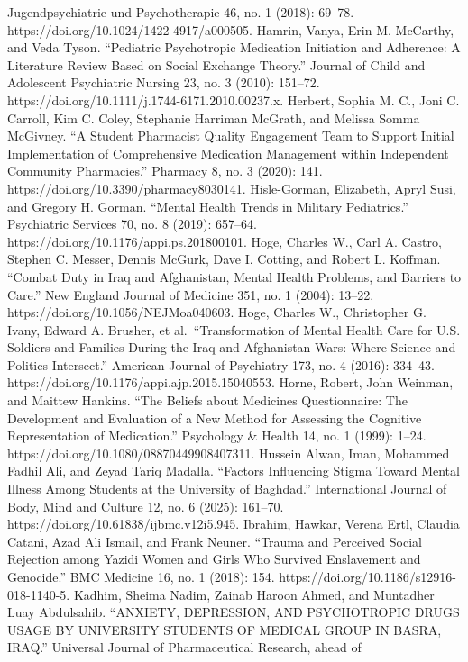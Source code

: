 Jugendpsychiatrie und Psychotherapie 46, no. 1 (2018): 69--78.
https://doi.org/10.1024/1422-4917/a000505. Hamrin, Vanya, Erin M.
McCarthy, and Veda Tyson. ``Pediatric Psychotropic Medication Initiation
and Adherence: A Literature Review Based on Social Exchange Theory.''
Journal of Child and Adolescent Psychiatric Nursing 23, no. 3 (2010):
151--72. https://doi.org/10.1111/j.1744-6171.2010.00237.x. Herbert,
Sophia M. C., Joni C. Carroll, Kim C. Coley, Stephanie Harriman McGrath,
and Melissa Somma McGivney. ``A Student Pharmacist Quality Engagement
Team to Support Initial Implementation of Comprehensive Medication
Management within Independent Community Pharmacies.'' Pharmacy 8, no. 3
(2020): 141. https://doi.org/10.3390/pharmacy8030141. Hisle-Gorman,
Elizabeth, Apryl Susi, and Gregory H. Gorman. ``Mental Health Trends in
Military Pediatrics.'' Psychiatric Services 70, no. 8 (2019): 657--64.
https://doi.org/10.1176/appi.ps.201800101. Hoge, Charles W., Carl A.
Castro, Stephen C. Messer, Dennis McGurk, Dave I. Cotting, and Robert L.
Koffman. ``Combat Duty in Iraq and Afghanistan, Mental Health Problems,
and Barriers to Care.'' New England Journal of Medicine 351, no. 1
(2004): 13--22. https://doi.org/10.1056/NEJMoa040603. Hoge, Charles W.,
Christopher G. Ivany, Edward A. Brusher, et al.~``Transformation of
Mental Health Care for U.S. Soldiers and Families During the Iraq and
Afghanistan Wars: Where Science and Politics Intersect.'' American
Journal of Psychiatry 173, no. 4 (2016): 334--43.
https://doi.org/10.1176/appi.ajp.2015.15040553. Horne, Robert, John
Weinman, and Maittew Hankins. ``The Beliefs about Medicines
Questionnaire: The Development and Evaluation of a New Method for
Assessing the Cognitive Representation of Medication.'' Psychology \&
Health 14, no. 1 (1999): 1--24.
https://doi.org/10.1080/08870449908407311. Hussein Alwan, Iman, Mohammed
Fadhil Ali, and Zeyad Tariq Madalla. ``Factors Influencing Stigma Toward
Mental Illness Among Students at the University of Baghdad.''
International Journal of Body, Mind and Culture 12, no. 6 (2025):
161--70. https://doi.org/10.61838/ijbmc.v12i5.945. Ibrahim, Hawkar,
Verena Ertl, Claudia Catani, Azad Ali Ismail, and Frank Neuner. ``Trauma
and Perceived Social Rejection among Yazidi Women and Girls Who Survived
Enslavement and Genocide.'' BMC Medicine 16, no. 1 (2018): 154.
https://doi.org/10.1186/s12916-018-1140-5. Kadhim, Sheima Nadim, Zainab
Haroon Ahmed, and Muntadher Luay Abdulsahib. ``ANXIETY, DEPRESSION, AND
PSYCHOTROPIC DRUGS USAGE BY UNIVERSITY STUDENTS OF MEDICAL GROUP IN
BASRA, IRAQ.'' Universal Journal of Pharmaceutical Research, ahead of
